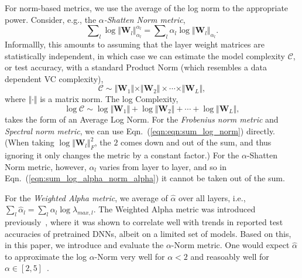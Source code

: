 For norm-based metrics, we use the average of the log norm to the appropriate power.
Consider, e.g., the \emph{$\alpha$-Shatten Norm metric}, 
\begin{equation}
\label{eqn:sum_log_alpha_norm_alpha}
\sum\nolimits_l \log \Vert\mathbf{W}_l\Vert_{\alpha_l}^{\alpha_l} 
=
\sum\nolimits_l \alpha_l \log \Vert\mathbf{W}_l\Vert_{\alpha_l} .
\end{equation}
Informallly, this amounts to assuming that the layer weight matrices are statistically independent, in which case we can estimate the model complexity $\mathcal{C}$, or test accuracy, with a standard Product Norm (which resembles a data dependent VC complexity),
\begin{equation}
\mathcal{C}\sim\Vert\mathbf{W}_{1}\Vert\times\Vert\mathbf{W}_{2}\Vert \times \cdots \times \Vert\mathbf{W}_{L}\Vert ,
\end{equation}
where $\Vert\cdot\Vert$ is a matrix norm.   
The log Complexity,
\begin{equation}
\label{eqn:eqn:sum_log_norm}
\log\mathcal{C} \sim \log\Vert\mathbf{W}_{1}\Vert+\log\Vert\mathbf{W}_{2}\Vert + \cdots + \log\Vert\mathbf{W}_{L}\Vert  ,
\end{equation}
 takes the form of an Average Log Norm.
For the \emph{Frobenius norm metric} and \emph{Spectral norm metric}, we can use Eqn.~(\ref{eqn:eqn:sum_log_norm}) directly. 
(When taking $\log\Vert\mathbf{W}_{l}\Vert_{F}^{2}$, the $2$ comes down and out of the sum, and thus ignoring it only changes the metric by a constant factor.)
For the $\alpha$-Shatten Norm metric, however, $\alpha_l$ varies from layer to layer, and so in Eqn.~(\ref{eqn:sum_log_alpha_norm_alpha}) it cannot be taken out of the sum.


For the \emph{Weighted Alpha metric}, we average of $\hat{\alpha}$ over all layers, i.e., 
$ %
\sum_l \hat{\alpha}_l = \sum_l \alpha_l\log\lambda_{max,l}  .  
$ %
The Weighted Alpha metric was introduced previously~\cite{MM20_SDM}, where it was shown to correlate well with trends in reported test accuracies of pretrained DNNs, albeit on a limited set of models.
Based on this, in this paper, we introduce and evaluate the $\alpha$-Norm metric.
One would expect $\hat{\alpha}$ to approximate the log $\alpha$-Norm very well for $\alpha < 2$ and reasoably well for $\alpha\in[2,5]$~\cite{MM20_unpub_work}.

